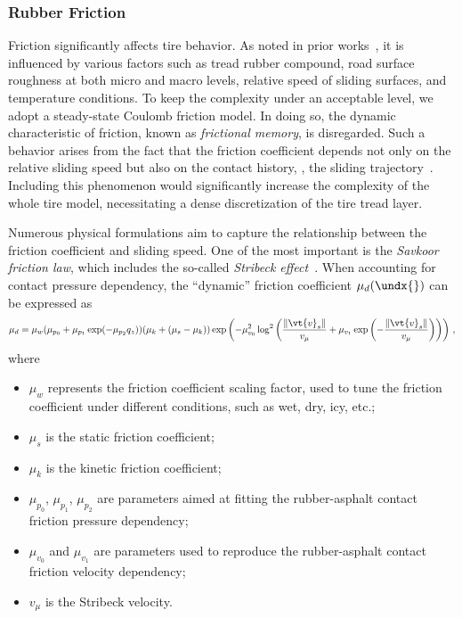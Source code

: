 
\subsubsection{Rubber Friction}
\label{app3:sec:rubber_friction}

Friction significantly affects tire behavior. As noted in prior works~\cite{selig2014rubber, savkoor1965friction, savkoor1987dry, tiwari2017rubber}, it is influenced by various factors such as tread rubber compound, road surface roughness at both micro and macro levels, relative speed of sliding surfaces, and temperature conditions. To keep the complexity under an acceptable level, we adopt a steady-state Coulomb friction model. In doing so, the dynamic characteristic of friction,  known as \emph{frictional memory}, is disregarded. Such a behavior arises from the fact that the friction coefficient depends not only on the relative sliding speed but also on the contact history, \ie{}, the sliding trajectory~\cite{persson2010rubber}. Including this phenomenon would significantly increase the complexity of the whole tire model, necessitating a dense discretization of the tire tread layer.

Numerous physical formulations aim to capture the relationship between the friction coefficient and sliding speed. One of the most important is the \emph{Savkoor friction law}, which includes the so-called \emph{Stribeck effect}~\cite{savkoor1965friction, savkoor1966some, savkoor1987dry}. When accounting for contact pressure dependency, the ``dynamic'' friction coefficient $\mu_d(\undx{})$ can be expressed as
%
\begin{equation*}
  \mu_d = \mu_w (\mu_{p_0} + \mu_{p_1} \exp( -\mu_{p_2} q_z )) (\mu_k + (\mu_s - \mu_k)) \exp\left( -\mu_{v_0}^2 \log^2 \left( \dfrac{\|\vt{v}_s\|}{v_\mu} + \mu_{v_1} \exp\left(-\dfrac{\|\vt{v}_s\|}{v_\mu}\right)\right)\right) \, \text{,}
\end{equation*}
%
where
%
\begin{itemize}
  \setlength{\itemsep}{0.0em}
  \item $\mu_w$ represents the friction coefficient scaling factor, used to tune the friction coefficient under different conditions, such as wet, dry, icy, etc.;
  \item $\mu_s$ is the static friction coefficient;
  \item $\mu_k$ is the kinetic friction coefficient;
  \item $\mu_{p_0}$, $\mu_{p_1}$, $\mu_{p_2}$ are parameters aimed at fitting the rubber-asphalt contact friction pressure dependency;
  \item $\mu_{v_0}$ and $\mu_{v_1}$ are parameters used to reproduce the rubber-asphalt contact friction velocity dependency;
  \item $v_\mu$ is the Stribeck velocity.
\end{itemize}

